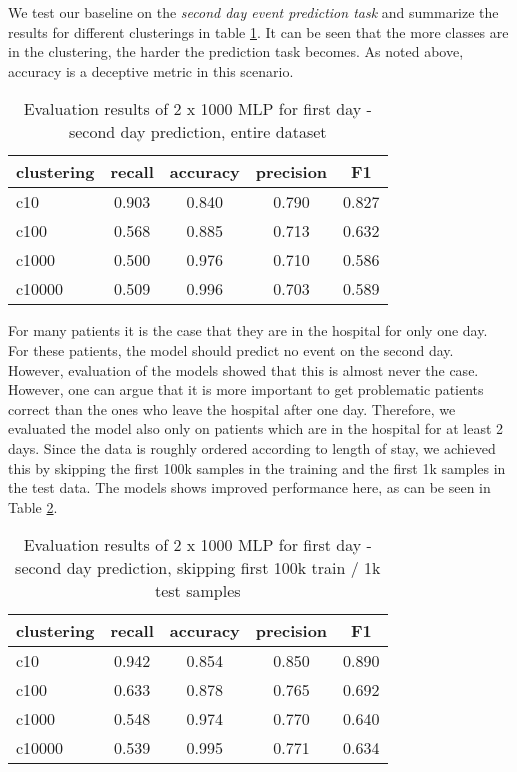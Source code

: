 We test our baseline on the \emph{second day event prediction task} and summarize the results for different clusterings in table \ref{tab:mytable2}. It can be seen that the more classes are in the clustering, the harder the prediction task becomes. As noted above, accuracy is a deceptive metric in this scenario.

\begin{table}[H]
  \centering
    \begin{tabular}{lcccc} \toprule
        {clustering} & {recall} & {accuracy} & {precision} & {F1}  \\ \midrule
        {c10}  & 0.903 & 0.840 & 0.790 & 0.827 \\
        {c100}  & 0.568 & 0.885 & 0.713 & 0.632 \\
        {c1000}  & 0.500  & 0.976 & 0.710  & 0.586 \\
        {c10000}  & 0.509  & 0.996 &  0.703  & 0.589 \\ \midrule
    \end{tabular}
  \caption{Evaluation results of 2 x 1000 MLP for first day - second day  prediction, entire dataset}
  \label{tab:mytable2}
\end{table}



For many patients it is the case that they are in the hospital for only one day. For these patients, the model should predict no event on the second day. However, evaluation of the models showed that this is almost never the case. However, one can argue that it is more important to get problematic patients correct than the ones who leave the hospital after one day. Therefore, we evaluated the model also only on patients which are in the hospital for at least 2 days. Since the data is roughly ordered according to length of stay, we achieved this by skipping the first 100k samples in the training and the first 1k samples in the test data. The models shows improved performance here, as can be seen in Table \ref{tab:mytable1}.


\begin{table}[H]
  \centering
    \begin{tabular}{lcccc} \toprule
        {clustering} & {recall} & {accuracy} & {precision} & {F1}  \\ \midrule
        {c10}  & 0.942  & 0.854 & 0.850  &  0.890 \\ 
        {c100}  & 0.633  & 0.878 & 0.765  &  0.692 \\ 
        {c1000}  & 0.548  & 0.974 & 0.770  &  0.640 \\ 
        {c10000}  &  0.539  & 0.995 & 0.771  &  0.634 \\ \midrule
        
    \end{tabular}
  \caption{Evaluation results of 2 x 1000 MLP for first day - second day  prediction, skipping first 100k train / 1k test samples}  \label{tab:mytable1}
\end{table}


